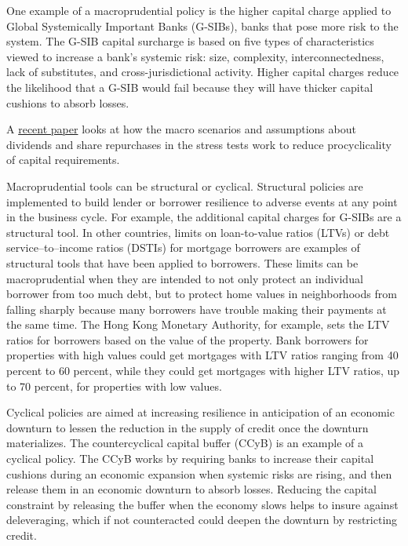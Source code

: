 \documentclass[
]{book}
\begin{document}
One example of a macroprudential policy is the higher capital charge applied to Global Systemically Important Banks (G-SIBs), banks that pose more risk to the system. The G-SIB capital surcharge is based on five types of characteristics viewed to increase a bank's systemic risk: size, complexity, interconnectedness, lack of substitutes, and cross-jurisdictional activity. Higher capital charges reduce the likelihood that a G-SIB would fail because they will have thicker capital cushions to absorb losses.

A \href{https://www.brookings.edu/research/understanding-the-effects-of-the-u-s-stress-tests/}{recent paper} looks at how the macro scenarios and assumptions about dividends and share repurchases in the stress tests work to reduce procyclicality of capital requirements.

Macroprudential tools can be structural or cyclical. Structural policies are implemented to build lender or borrower resilience to adverse events at any point in the business cycle. For example, the additional capital charges for G-SIBs are a structural tool. In other countries, limits on loan-to-value ratios (LTVs) or debt service--to--income ratios (DSTIs) for mortgage borrowers are examples of structural tools that have been applied to borrowers. These limits can be macroprudential when they are intended to not only protect an individual borrower from too much debt, but to protect home values in neighborhoods from falling sharply because many borrowers have trouble making their payments at the same time. The Hong Kong Monetary Authority, for example, sets the LTV ratios for borrowers based on the value of the property. Bank borrowers for properties with high values could get mortgages with LTV ratios ranging from 40 percent to 60 percent, while they could get mortgages with higher LTV ratios, up to 70 percent, for properties with low values.

Cyclical policies are aimed at increasing resilience in anticipation of an economic downturn to lessen the reduction in the supply of credit once the downturn materializes. The countercyclical capital buffer (CCyB) is an example of a cyclical policy. The CCyB works by requiring banks to increase their capital cushions during an economic expansion when systemic risks are rising, and then release them in an economic downturn to absorb losses. Reducing the capital constraint by releasing the buffer when the economy slows helps to insure against deleveraging, which if not counteracted could deepen the downturn by restricting credit.
\end{document}
